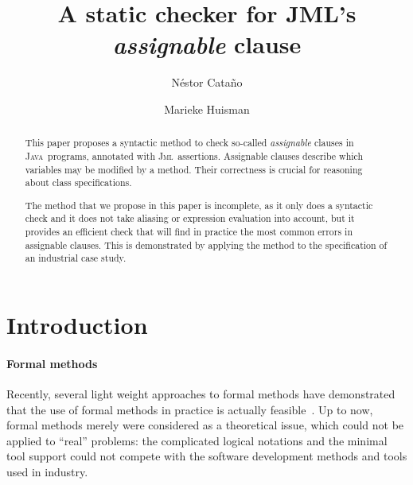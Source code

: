 \documentclass[a4paper]{llncs}
\title{A static checker for JML's \emph{assignable} clause}
\author{
  N\'estor Cata\~no
\and
  Marieke Huisman
}
\institute{
  \inria\ Sophia-Antipolis, France \\ 
  \email{\{Nestor.Catano, Marieke.Huisman\}@sophia.inria.fr}
}
\newcommand{\jml}{\textsc{Jml}}
\newcommand{\java}{\textsc{Java}}
\newcommand{\gplus}{\textsc{GemPlus}}
\begin{document}
\fussy
\maketitle
\pagestyle{plain}

\begin{abstract}
This paper proposes a syntactic method to check so-called
\emph{assignable} clauses in \java\ programs, annotated with \jml\
assertions. Assignable clauses describe which variables may be
modified by a method. Their correctness is crucial for reasoning about 
class specifications. 

The method that we propose in this paper is incomplete, as it only
does a syntactic check and it does not take aliasing or expression
evaluation into account, but it provides an efficient check that will
find in practice the most common errors in assignable clauses. This is
demonstrated by applying the method to the specification of an
industrial case study.



\end{abstract}






\section{Introduction}
\label{sec-intro}

\paragraph{\bf Formal methods}

Recently, several light weight approaches to formal methods have
demonstrated that the use of formal methods in practice is actually
feasible~\cite{LeinoNS00,CatanoH02a}.  Up to now, formal methods
merely were considered as a theoretical issue, which could not be
applied to ``real'' problems: the complicated logical notations and
the minimal tool support could not compete with the software
development methods and tools used in industry.
\end{document}
